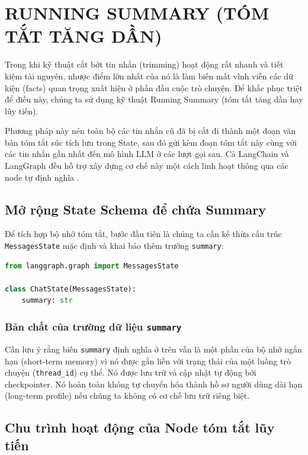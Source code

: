 \chapter{RUNNING SUMMARY (TÓM TẮT TĂNG DẦN)}
\label{chap:summarization}

Trong khi kỹ thuật cắt bớt tin nhắn (trimming) hoạt động rất nhanh và tiết kiệm tài nguyên, nhược điểm lớn nhất của nó là làm biến mất vĩnh viễn các dữ kiện (facts) quan trọng xuất hiện ở phần đầu cuộc trò chuyện. Để khắc phục triệt để điều này, chúng ta sử dụng kỹ thuật Running Summary (tóm tắt tăng dần hay lũy tiến). 

Phương pháp này nén toàn bộ các tin nhắn cũ đã bị cắt đi thành một đoạn văn bản tóm tắt súc tích lưu trong State, sau đó gửi kèm đoạn tóm tắt này cùng với các tin nhắn gần nhất đến mô hình LLM ở các lượt gọi sau. Cả LangChain và LangGraph đều hỗ trợ xây dựng cơ chế này một cách linh hoạt thông qua các node tự định nghĩa \parencite{langchainShortTermMemory,langgraphAddMemory}.

\section{Mở rộng State Schema để chứa Summary}

Để tích hợp bộ nhớ tóm tắt, bước đầu tiên là chúng ta cần kế thừa cấu trúc \texttt{MessagesState} mặc định và khai báo thêm trường \texttt{summary}:

\begin{lstlisting}[language=Python,caption={State có thêm summary}]
from langgraph.graph import MessagesState

class ChatState(MessagesState):
    summary: str
\end{lstlisting}

\subsection{Bản chất của trường dữ liệu \texttt{summary}}
Cần lưu ý rằng biến \texttt{summary} định nghĩa ở trên vẫn là một phần của bộ nhớ ngắn hạn (short-term memory) vì nó được gắn liền với trạng thái của một luồng trò chuyện (\texttt{thread\_id}) cụ thể. Nó được lưu trữ và cập nhật tự động bởi checkpointer. Nó hoàn toàn không tự chuyển hóa thành hồ sơ người dùng dài hạn (long-term profile) nếu chúng ta không có cơ chế lưu trữ riêng biệt.

\section{Chu trình hoạt động của Node tóm tắt lũy tiến}

